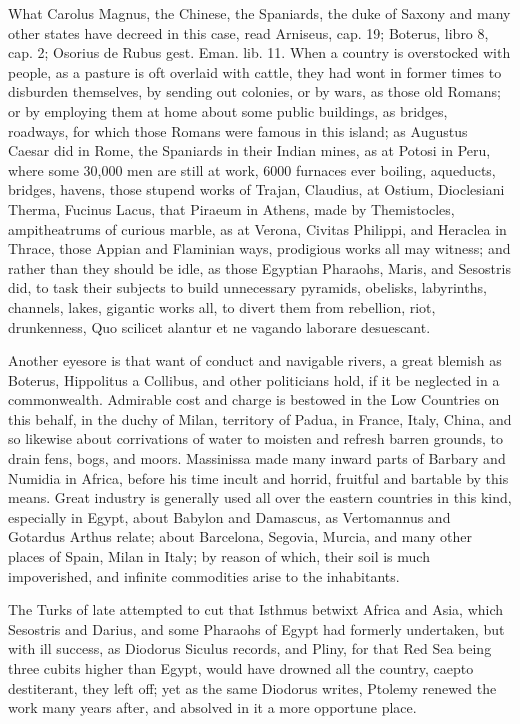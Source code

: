 {What Carolus Magnus, the Chinese, the Spaniards, the duke of Saxony and
many other states have decreed in this case, read Arniseus, cap. 19;
Boterus, libro 8, cap. 2; Osorius de Rubus gest. Eman. lib. 11. When a
country is overstocked with people, as a pasture is oft overlaid with
cattle, they had wont in former times to disburden themselves, by
sending out colonies, or by wars, as those old Romans; or by employing
them at home about some public buildings, as bridges, roadways, for
which those Romans were famous in this island; as Augustus Caesar did
in Rome, the Spaniards in their Indian mines, as at Potosi in Peru,
where some 30,000 men are still at work, 6000 furnaces ever boiling,
\etc{} aqueducts, bridges, havens, those stupend works of Trajan,
Claudius, at Ostium, Dioclesiani Therma, Fucinus Lacus, that
Piraeum in Athens, made by Themistocles, ampitheatrums of curious
marble, as at Verona, Civitas Philippi, and Heraclea in Thrace, those
Appian and Flaminian ways, prodigious works all may witness; and rather
than they should be idle, as those  Egyptian Pharaohs, Maris,
and Sesostris did, to task their subjects to build unnecessary
pyramids, obelisks, labyrinths, channels, lakes, gigantic works all, to
divert them from rebellion, riot, drunkenness, Quo scilicet
alantur et ne vagando laborare desuescant.

Another eyesore is that want of conduct and navigable rivers, a great
blemish as Boterus, Hippolitus a Collibus, and other
politicians hold, if it be neglected in a commonwealth. Admirable cost
and charge is bestowed in the Low Countries on this behalf, in the
duchy of Milan, territory of Padua, in France, Italy, China, and
so likewise about corrivations of water to moisten and refresh barren
grounds, to drain fens, bogs, and moors. Massinissa made many inward
parts of Barbary and Numidia in Africa, before his time incult and
horrid, fruitful and bartable by this means. Great industry is
generally used all over the eastern countries in this kind, especially
in Egypt, about Babylon and Damascus, as Vertomannus and Gotardus
Arthus relate; about Barcelona, Segovia, Murcia, and many other places
of Spain, Milan in Italy; by reason of which, their soil is much
impoverished, and infinite commodities arise to the inhabitants.

The Turks of late attempted to cut that Isthmus betwixt Africa and
Asia, which Sesostris and Darius, and some Pharaohs of Egypt had
formerly undertaken, but with ill success, as Diodorus Siculus
records, and Pliny, for that Red Sea being three cubits higher
than Egypt, would have drowned all the country, caepto destiterant,
they left off; yet as the same Diodorus writes, Ptolemy renewed
the work many years after, and absolved in it a more opportune place.

}
